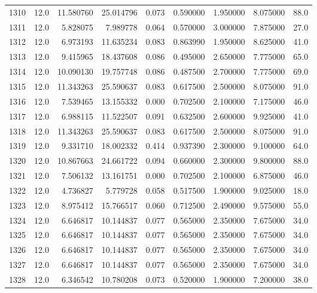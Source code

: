 \begin{tabular}{lrrrrrrrr}
1310 &   12.0 &  11.580760 &  25.014796 &  0.073 &  0.590000 &  1.950000 &   8.075000 &   88.0 \\
1311 &   12.0 &   5.828075 &   7.989778 &  0.064 &  0.570000 &  3.000000 &   7.875000 &   27.0 \\
1312 &   12.0 &   6.973193 &  11.635234 &  0.083 &  0.863990 &  1.950000 &   8.625000 &   41.0 \\
1313 &   12.0 &   9.415965 &  18.437608 &  0.086 &  0.495000 &  2.650000 &   7.775000 &   65.0 \\
1314 &   12.0 &  10.090130 &  19.757748 &  0.086 &  0.487500 &  2.700000 &   7.775000 &   69.0 \\
1315 &   12.0 &  11.343263 &  25.590637 &  0.083 &  0.617500 &  2.500000 &   8.075000 &   91.0 \\
1316 &   12.0 &   7.539465 &  13.155332 &  0.000 &  0.702500 &  2.100000 &   7.175000 &   46.0 \\
1317 &   12.0 &   6.988115 &  11.522507 &  0.091 &  0.632500 &  2.600000 &   9.925000 &   41.0 \\
1318 &   12.0 &  11.343263 &  25.590637 &  0.083 &  0.617500 &  2.500000 &   8.075000 &   91.0 \\
1319 &   12.0 &   9.331710 &  18.002332 &  0.414 &  0.937390 &  2.300000 &   9.100000 &   64.0 \\
1320 &   12.0 &  10.867663 &  24.661722 &  0.094 &  0.660000 &  2.300000 &   9.800000 &   88.0 \\
1321 &   12.0 &   7.506132 &  13.161751 &  0.000 &  0.702500 &  2.100000 &   6.875000 &   46.0 \\
1322 &   12.0 &   4.736827 &   5.779728 &  0.058 &  0.517500 &  1.900000 &   9.025000 &   18.0 \\
1323 &   12.0 &   8.975412 &  15.766517 &  0.060 &  0.712500 &  2.490000 &   9.575000 &   55.0 \\
1324 &   12.0 &   6.646817 &  10.144837 &  0.077 &  0.565000 &  2.350000 &   7.675000 &   34.0 \\
1325 &   12.0 &   6.646817 &  10.144837 &  0.077 &  0.565000 &  2.350000 &   7.675000 &   34.0 \\
1326 &   12.0 &   6.646817 &  10.144837 &  0.077 &  0.565000 &  2.350000 &   7.675000 &   34.0 \\
1327 &   12.0 &   6.646817 &  10.144837 &  0.077 &  0.565000 &  2.350000 &   7.675000 &   34.0 \\
1328 &   12.0 &   6.346542 &  10.780208 &  0.073 &  0.520000 &  1.900000 &   7.200000 &   38.0 \\

\end{tabular}
